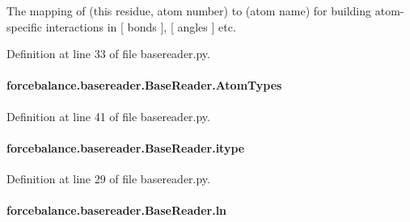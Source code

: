 The mapping of (this residue, atom number) to (atom name) for building atom-\/specific interactions in \mbox{[} bonds \mbox{]}, \mbox{[} angles \mbox{]} etc. 



Definition at line 33 of file basereader.\-py.

\hypertarget{classforcebalance_1_1basereader_1_1BaseReader_ad5765e192499937376950410364014af}{
\paragraph[{Atom\-Types}]{\setlength{\rightskip}{0pt plus 5cm}forcebalance.\-basereader.\-Base\-Reader.\-Atom\-Types\hspace{0.3cm}{\ttfamily [inherited]}}}\label{classforcebalance_1_1basereader_1_1BaseReader_ad5765e192499937376950410364014af}


Definition at line 41 of file basereader.\-py.

\hypertarget{classforcebalance_1_1basereader_1_1BaseReader_a0c5b4d7b1c87dbcc9a8a0fdc82eee023}{
\paragraph[{itype}]{\setlength{\rightskip}{0pt plus 5cm}forcebalance.\-basereader.\-Base\-Reader.\-itype\hspace{0.3cm}{\ttfamily [inherited]}}}\label{classforcebalance_1_1basereader_1_1BaseReader_a0c5b4d7b1c87dbcc9a8a0fdc82eee023}


Definition at line 29 of file basereader.\-py.

\hypertarget{classforcebalance_1_1basereader_1_1BaseReader_ab04436f3968d9bd6ec09238ee6537ec6}{
\paragraph[{ln}]{\setlength{\rightskip}{0pt plus 5cm}forcebalance.\-basereader.\-Base\-Reader.\-ln\hspace{0.3cm}{\ttfamily [inherited]}}}\label{classforcebalance_1_1basereader_1_1BaseReader_ab04436f3968d9bd6ec09238ee6537ec6}


